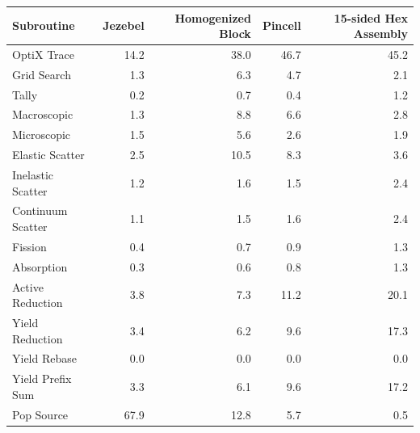 \begin{table}[h!]
\begin{tabular}{| l | r  | r | r | r |}
 \hline
Subroutine         & Jezebel & Homogenized Block & Pincell & 15-sided Hex Assembly  \\
\hline \hline
 OptiX Trace       & 14.2       &      38.0            &   46.7    &    45.2     \\ \hline
 Grid Search       &  1.3      &        6.3                 &  4.7     &     2.1      \\ \hline
 Tally                   &  0.2      &         0.7               &   0.4    &    1.2       \\ \hline
 Macroscopic      &  1.3     &          8.8               &  6.6      &    2.8     \\ \hline
 Microscopic       &  1.5      &          5.6               &  2.6     &    1.9       \\ \hline
 Elastic Scatter   &  2.5      &        10.5                 &   8.3    &   3.6      \\ \hline
 Inelastic Scatter & 1.2       &        1.6                  &  1.5    &    2.4    \\ \hline
 Continuum Scatter & 1.1  &         1.5                 &   1.6   &    2.4   \\ \hline
 Fission               &  0.4      &         0.7                 &   0.9   &    1.3      \\ \hline
 Absorption          & 0.3       &         0.6                 &   0.8   &    1.3      \\ \hline
Active Reduction  &  3.8      &        7.3                  &   11.2   &  20.1        \\ \hline
 Yield Reduction  &   3.4     &        6.2                 &  9.6    &    17.3     \\ \hline
 Yield Rebase     &    0.0     &       0.0                   &   0.0  &    0.0    \\ \hline
 Yield Prefix Sum &   3.3    &       6.1                    &  9.6   &    17.2    \\ \hline
 Pop Source         &  67.9     &     12.8                    & 5.7    &    0.5    \\ 
\hline
\end{tabular}
\end{table}


